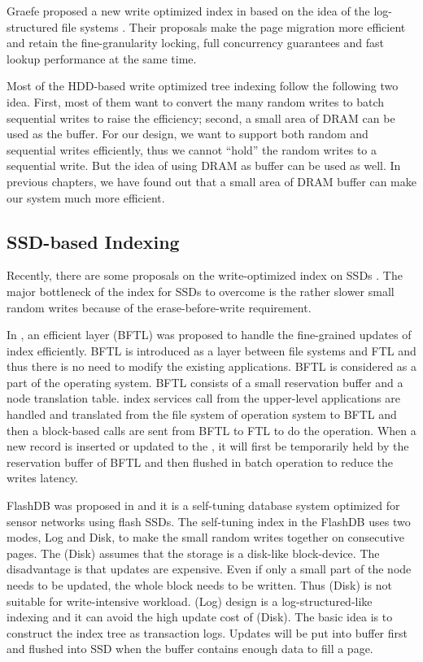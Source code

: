 Graefe proposed a new write optimized \bplustree index in \cite{graefe2004write}
based on the idea of the log-structured file systems \cite{rosenblum1991design}.
Their proposals make the page migration more efficient and retain the fine-granularity locking, full concurrency guarantees and fast lookup performance at the same time.

Most of the HDD-based write optimized tree indexing follow the following two idea. First, most of them want to convert the many random writes to batch sequential writes to raise the efficiency; second, a small area of DRAM can be used as the buffer. For our design, we want to support both random and sequential writes efficiently, thus we cannot ``hold'' the random writes to a sequential write. But the idea of using DRAM as buffer can be used as well. In previous chapters, we have found out that a small area of DRAM buffer can make our system much more efficient.

\subsection{SSD-based Indexing}
\label{sec:ssd-index}
Recently, there are some proposals
on the write-optimized
\bplustree index on SSDs \cite{agrawal2009lazy}\cite{li2010tree}\cite{wu2007efficient}.
The major bottleneck of the \bplustree
index for SSDs to overcome is the rather
slower small random writes because of the erase-before-write requirement.

In \cite{wu2007efficient}, an efficient \btree layer (BFTL) was proposed to handle the fine-grained updates of \btree index efficiently. BFTL is introduced as a layer between file systems and FTL and thus there is no need to modify the existing applications. BFTL is considered as a part of the operating system. BFTL consists of a small reservation buffer and a node translation table. \bplustree index services call from the upper-level applications are handled and translated from the file system of operation system to BFTL and then a block-based calls are sent from BFTL to FTL to do the operation. When a new record is inserted or updated to the \bplustree, it will first be temporarily held by the reservation buffer of BFTL and then flushed in batch operation to reduce the writes latency.

FlashDB was proposed in \cite{nath2007flashdb} and it is a self-tuning database system optimized for sensor networks using flash SSDs. The self-tuning \bplustree index in the FlashDB uses two modes, Log and Disk, to make the small random writes together on consecutive pages. The \bplustree(Disk) assumes that the storage is a disk-like block-device. The disadvantage is that updates are expensive. Even if only a small part of the node needs to be updated, the whole block needs to be written. Thus \bplustree(Disk) is not suitable for write-intensive workload. \bplustree(Log) design is a log-structured-like indexing and it can avoid the high update cost of \bplustree(Disk). The basic idea is to construct the index tree as transaction logs. Updates will be put into buffer first and flushed into SSD when the buffer contains enough data to fill a page.

